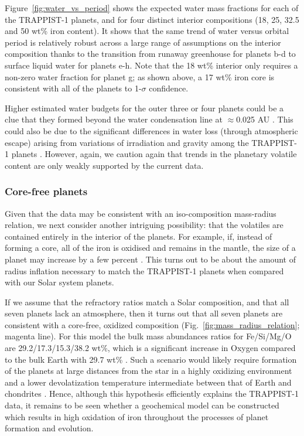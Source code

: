 \documentclass[twocolumn]{aastex63}
\begin{document}
Figure~\ref{fig:water_vs_period} shows the expected water mass fractions for each of the TRAPPIST-1 planets, and for four distinct interior compositions (18, 25, 32.5 and 50 wt\% iron content). It shows that the same trend of water versus orbital period is relatively robust across a large range of assumptions on the interior composition thanks to the transition from runaway greenhouse for planets b-d to surface liquid water for planets e-h.  Note that the 18 wt\% interior only requires a non-zero water fraction for planet g;  as shown above, a 17 wt\% iron core is consistent with all of the planets to 1-$\sigma$ confidence.

Higher estimated water budgets for the outer three or four planets could be a clue that they formed beyond the water condensation line at $\approx$0.025 AU \citep{Unterborn2018a}. This could also be due to the significant differences in water loss (through atmospheric escape) arising from variations of irradiation and gravity among the TRAPPIST-1 planets \citep{Lissauer2007, Bolmont2017,Bourrier2017}.  However, again, we caution again that trends in the planetary volatile content are only weakly supported by the current data.

\subsubsection{Core-free planets} \label{sec:core_free}

Given that the data may be consistent with an iso-composition mass-radius relation, we next consider another intriguing possibility:
 that the volatiles are contained entirely in the interior of the planets.  For example, if, instead of forming a core, all of the iron is oxidised and remains in the mantle, the size of a planet may increase by a few percent \citep{ElkinsTanton2008}.  This turns out to be about the amount of radius inflation necessary to match the TRAPPIST-1 planets when compared with our Solar system planets.   
 
 If we assume that the refractory ratios match a Solar composition, and that all seven planets lack an atmosphere, then it turns out that all seven planets are consistent with a core-free, oxidized composition (Fig.\ \ref{fig:mass_radius_relation}; magenta line).  For this model the bulk mass abundances ratios for Fe/Si/Mg/O are 29.2/17.3/15.3/38.2 wt\%, which is a significant increase in Oxygen compared to the bulk Earth with 29.7 wt\% \citep{McDonough2014}.
  Such a scenario would likely require formation of the planets at large distances from the star in a highly oxidizing environment \citep{ElkinsTanton2008} and a lower  devolatization temperature intermediate between that of Earth and chondrites \citep{Wang2019}.  Hence, although this hypothesis efficiently explains the TRAPPIST-1 data, it remains to be seen whether a geochemical model can be constructed which results in high oxidation of iron throughout the processes of planet formation and evolution.
\end{document}
